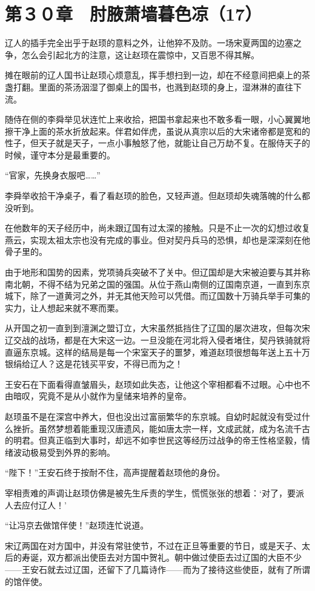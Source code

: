 \section{第３０章　肘腋萧墙暮色凉（17）}

辽人的插手完全出乎于赵顼的意料之外，让他猝不及防。一场宋夏两国的边塞之争，怎么会引起北方的注意，这让赵顼在震惊中，又百思不得其解。

摊在眼前的辽人国书让赵顼心烦意乱，挥手想扫到一边，却在不经意间把桌上的茶盏打翻。里面的茶汤洇湿了御桌上的国书，也溅到赵顼的身上，湿淋淋的直往下流。

随侍在侧的李舜举见状连忙上来收拾，把国书拿起来也不敢多看一眼，小心翼翼地擦干净上面的茶水折放起来。伴君如伴虎，虽说从真宗以后的大宋诸帝都是宽和的性子，但天子就是天子，一点小事触怒了他，就能让自己万劫不复。在服侍天子的时候，谨守本分是最重要的。

“官家，先换身衣服吧……”

李舜举收拾干净桌子，看了看赵顼的脸色，又轻声道。但赵顼却失魂落魄的什么都没听到。

在他数年的天子经历中，尚未跟辽国有过太深的接触。只是不止一次的幻想过收复燕云，实现太祖太宗也没有完成的事业。但对契丹兵马的恐惧，却也是深深刻在他骨子里的。

由于地形和国势的因素，党项骑兵突破不了关中。但辽国却是大宋被迫要与其并称南北朝，不得不结为兄弟之国的强国。从位于燕山南侧的辽国南京道，一直到东京城下，除了一道黄河之外，并无其他天险可以凭借。而辽国数十万骑兵举手可集的实力，让人想起来就不寒而栗。

从开国之初一直到到澶渊之盟订立，大宋虽然抵挡住了辽国的屡次进攻，但每次宋辽交战的战场，都是在大宋这一边。一旦没能在河北将入侵者堵住，契丹铁骑就将直逼东京城。这样的结局是每一个宋室天子的噩梦，难道赵顼很想每年送上五十万银绢给辽人？这是花钱买平安，不得已而为之！

王安石在下面看得直皱眉头，赵顼如此失态，让他这个宰相都看不过眼。心中也不由暗叹，究竟不是从小就作为皇储来培养的皇帝。

赵顼虽不是在深宫中养大，但也没出过富丽繁华的东京城。自幼时起就没有受过什么挫折。虽然梦想着能重现汉唐遗风，能如唐太宗一样，文成武就，成为名流千古的明君。但真正临到大事时，却远不如李世民这等经历过战争的帝王性格坚毅，情绪波动极易受到外界的影响。

“陛下！”王安石终于按耐不住，高声提醒着赵顼他的身份。

宰相责难的声调让赵顼仿佛是被先生斥责的学生，慌慌张张的想着：‘对了，要派人去应付辽人！’

“让冯京去做馆伴使！”赵顼连忙说道。

宋辽两国在对方国中，并没有常驻使节，不过在正旦等重要的节日，或是天子、太后的寿诞，双方都派出使臣去对方国中贺礼。朝中做过使臣去过辽国的大臣不少——王安石就去过辽国，还留下了几篇诗作——而为了接待这些使臣，就有了所谓的馆伴使。

